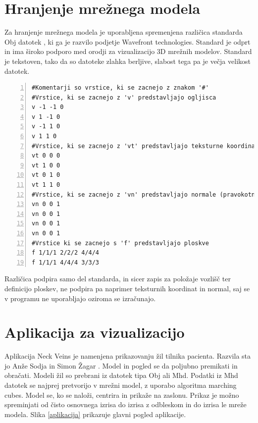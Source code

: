 \documentclass[a4paper, 12pt]{book}
\begin{document}
\section{Hranjenje mrežnega modela}

Za hranjenje mrežnega modela je uporabljena spremenjena različica standarda Obj datotek \cite{obj}, ki ga je razvilo podjetje Wavefront technologies. Standard je odprt in ima široko podporo med orodji za vizualizacijo 3D mrežnih modelov. Standard je tekstoven, tako da so datoteke zlahka berljive, slabost tega pa je večja velikost datotek.
\renewcommand{\lstlistingname}{Datoteka}
\renewcommand{\lstlistlistingname}{Seznam datotek}
{
\footnotesize
\begin{lstlisting}[captionpos=b, frame=single, caption={Primer Obj datoteke, ki predstavlja kvadrat.}, breaklines=true, firstline=1, numbers=left]
#Komentarji so vrstice, ki se zacnejo z znakom '#'
#Vrstice, ki se zacnejo z 'v' predstavljajo ogljisca 
v -1 -1 0
v 1 -1 0
v -1 1 0
v 1 1 0
#Vrstice, ki se zacnejo z 'vt' predstavljajo teksturne koordinate
vt 0 0 0
vt 1 0 0
vt 0 1 0
vt 1 1 0
#Vrstice, ki se zacnejo z 'vn' predstavljajo normale (pravokotnice?)
vn 0 0 1
vn 0 0 1
vn 0 0 1
vn 0 0 1
#Vrstice ki se zacnejo s 'f' predstavljajo ploskve
f 1/1/1 2/2/2 4/4/4
f 1/1/1 4/4/4 3/3/3
\end{lstlisting}}

Različica podpira samo del standarda, in sicer zapis za položaje vozlišč ter definicijo ploskev, ne podpira pa naprimer teksturnih koordinat in normal, saj se v programu ne uporabljajo oziroma se izračunajo.

\section{Aplikacija za vizualizacijo}

Aplikacija Neck Veins je namenjena prikazovanju žil tilnika pacienta. Razvila sta jo Anže Sodja \cite{sodja} in Simon Žagar \cite{zagar}. Model in pogled se da poljubno premikati in obračati. Modeli žil so prebrani iz datotek tipa Obj ali Mhd. Podatki iz Mhd datotek se najprej pretvorijo v mrežni model, z uporabo algoritma marching cubes.  Model se, ko se naloži, centrira in prikaže na zaslonu. Prikaz je možno spreminjati od čisto osnovnega izrisa do izrisa z odbleskom in do izrisa le mreže modela. Slika \ref{aplikacija} prikazuje glavni pogled aplikacije. 
\end{document}
